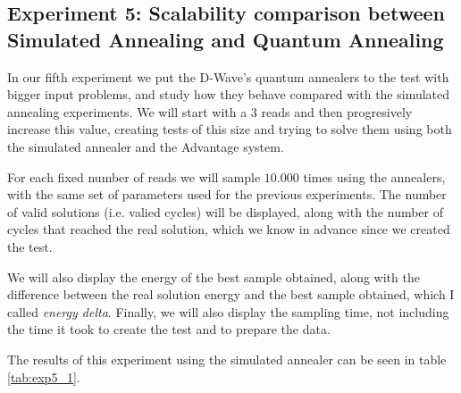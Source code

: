 \subsection{Experiment 5: Scalability comparison between Simulated Annealing and Quantum Annealing}


In our fifth experiment we put the D-Wave's quantum annealers to the test with bigger input problems, and study how they behave compared with the simulated annealing experiments. We will start with a $3$ reads and then progresively increase this value, creating tests of this size and trying to solve them using both the simulated annealer and the Advantage system.

For each fixed number of reads we will sample $10.000$ times using the annealers, with the same set of parameters used for the previous experiments. The number of valid solutions (i.e. valied cycles) will be displayed, along with the number of cycles that reached the real solution, which we know in advance since we created the test.

We will also display the energy of the best sample obtained, along with the difference between the real solution energy and the best sample obtained, which I called \emph{energy delta}. Finally, we will also display the sampling time, not including the time it took to create the test and to prepare the data.

The results of this experiment using the simulated annealer can be seen in table \ref{tab:exp5_1}. 

\begin{table}[H]
	\centering
	\caption{Results of experiment 5, $10.000$ reads using the simulated annealer.}
	\label{tab:exp5_1}
\end{table}

